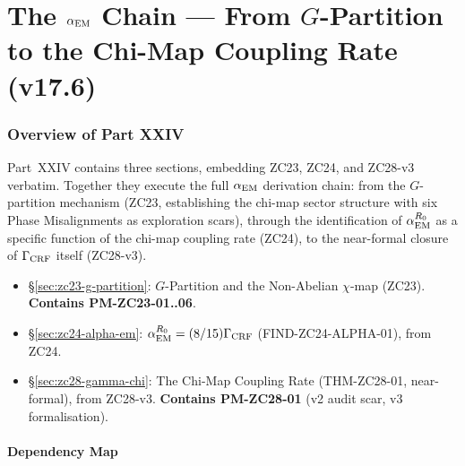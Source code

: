 \documentclass[12pt, a4paper]{article}
\begin{document}
\part{The $\alpha_{\rm EM}$ Chain --- From $G$-Partition to the Chi-Map Coupling Rate (v17.6)}
\label{part:XXIV}

\section*{Overview of Part XXIV}

Part~XXIV contains three sections, embedding ZC23, ZC24, and ZC28-v3
verbatim. Together they execute the full $\alpha_{\rm EM}$
derivation chain: from the $G$-partition mechanism (ZC23, establishing
the chi-map sector structure with six Phase Misalignments as exploration
scars), through the identification of $\alpha_{\rm EM}^{R_0}$ as a
specific function of the chi-map coupling rate (ZC24), to the
near-formal closure of $\Gamma_{\rm CRF}$ itself (ZC28-v3).

\begin{itemize}[leftmargin=2em]
\item \S\ref{sec:zc23-g-partition}: $G$-Partition and the Non-Abelian
  $\chi$-map (ZC23). \textbf{Contains PM-ZC23-01..06}.
\item \S\ref{sec:zc24-alpha-em}: $\alpha_{\rm EM}^{R_0} = (8/15)\Gamma_{\rm CRF}$
  (FIND-ZC24-ALPHA-01), from ZC24.
\item \S\ref{sec:zc28-gamma-chi}: The Chi-Map Coupling Rate
  (THM-ZC28-01, near-formal), from ZC28-v3.
  \textbf{Contains PM-ZC28-01} (v2 audit scar, v3 formalisation).
\end{itemize}

\subsection*{Dependency Map}

\begin{center}
\end{center}
\end{document}
